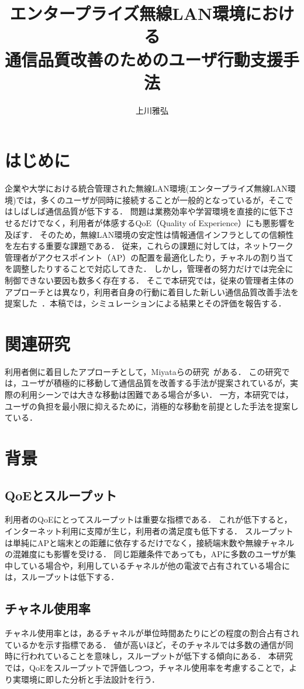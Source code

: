 \documentclass[dvipdfmx,twocolumn]{jsarticle}
\title{エンタープライズ無線LAN環境における\\通信品質改善のためのユーザ行動支援手法}
\author{上川雅弘}
\newcommand{\Note}[1]{\noindent \textbf{\textcolor{blue}{#1}}}
\begin{document}
\maketitle

\section{はじめに}
企業や大学における統合管理された無線LAN環境(エンタープライズ無線LAN環境)では，多くのユーザが同時に接続することが一般的となっているが，そこではしばしば通信品質が低下する．
問題は業務効率や学習環境を直接的に低下させるだけでなく，利用者が体感するQoE（Quality of Experience）にも悪影響を及ぼす．
そのため，無線LAN環境の安定性は情報通信インフラとしての信頼性を左右する重要な課題である．
従来，これらの課題に対しては，ネットワーク管理者がアクセスポイント（AP）の配置を最適化したり，チャネルの割り当てを調整したりすることで対応してきた．
しかし，管理者の努力だけでは完全に制御できない要因も数多く存在する．
そこで本研究では，従来の管理者主体のアプローチとは異なり，利用者自身の行動に着目した新しい通信品質改善手法を提案した~\cite{kamikawa2025}．本稿では，シミュレーションによる結果とその評価を報告する．
\section{関連研究}
利用者側に着目したアプローチとして，Miyataらの研究~\cite{Miyata2012}がある．
この研究では，ユーザが積極的に移動して通信品質を改善する手法が提案されているが，実際の利用シーンでは大きな移動は困難である場合が多い．
一方，本研究では，ユーザの負担を最小限に抑えるために，消極的な移動を前提とした手法を提案している．
\section{背景}
\subsection{QoEとスループット}
利用者のQoEにとってスループットは重要な指標である．
これが低下すると，インターネット利用に支障が生じ，利用者の満足度も低下する．
スループットは単純にAPと端末との距離に依存するだけでなく，接続端末数や無線チャネルの混雑度にも影響を受ける．
同じ距離条件であっても，APに多数のユーザが集中している場合や，利用しているチャネルが他の電波で占有されている場合には，スループットは低下する．
\subsection{チャネル使用率}
チャネル使用率とは，あるチャネルが単位時間あたりにどの程度の割合占有されているかを示す指標である．
値が高いほど，そのチャネルでは多数の通信が同時に行われていることを意味し，スループットが低下する傾向にある．
本研究では，QoEをスループットで評価しつつ，チャネル使用率を考慮することで，より実環境に即した分析と手法設計を行う．
\end{document}
